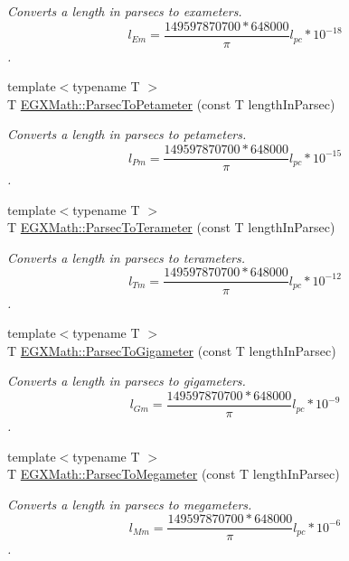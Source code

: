 \begin{DoxyCompactItemize}
\begin{DoxyCompactList}\small\item\em Converts a length in parsecs to exameters. \[ l_{Em}=\frac{149597870700 * 648000}{\pi}l_{pc} * 10^{-18} \]. \end{DoxyCompactList}\item 
{\footnotesize template$<$typename T $>$ }\\T \mbox{\hyperlink{group___e_g_x_math-_conversions-_length_conversions-_astronomical-_parsec-_s_i_ga9902983ed9563d247c8701370a95eb55}{E\+G\+X\+Math\+::\+Parsec\+To\+Petameter}} (const T length\+In\+Parsec)
\begin{DoxyCompactList}\small\item\em Converts a length in parsecs to petameters. \[ l_{Pm}=\frac{149597870700 * 648000}{\pi}l_{pc} * 10^{-15} \]. \end{DoxyCompactList}\item 
{\footnotesize template$<$typename T $>$ }\\T \mbox{\hyperlink{group___e_g_x_math-_conversions-_length_conversions-_astronomical-_parsec-_s_i_gafa04d007102c3b440653c9c0460b0cd8}{E\+G\+X\+Math\+::\+Parsec\+To\+Terameter}} (const T length\+In\+Parsec)
\begin{DoxyCompactList}\small\item\em Converts a length in parsecs to terameters. \[ l_{Tm}=\frac{149597870700 * 648000}{\pi}l_{pc} * 10^{-12} \]. \end{DoxyCompactList}\item 
{\footnotesize template$<$typename T $>$ }\\T \mbox{\hyperlink{group___e_g_x_math-_conversions-_length_conversions-_astronomical-_parsec-_s_i_ga8b4677ca02eae3ff100d1cdca6ae2392}{E\+G\+X\+Math\+::\+Parsec\+To\+Gigameter}} (const T length\+In\+Parsec)
\begin{DoxyCompactList}\small\item\em Converts a length in parsecs to gigameters. \[ l_{Gm}=\frac{149597870700 * 648000}{\pi}l_{pc} * 10^{-9} \]. \end{DoxyCompactList}\item 
{\footnotesize template$<$typename T $>$ }\\T \mbox{\hyperlink{group___e_g_x_math-_conversions-_length_conversions-_astronomical-_parsec-_s_i_ga2b7c62d851d25cb2041e3bc339110790}{E\+G\+X\+Math\+::\+Parsec\+To\+Megameter}} (const T length\+In\+Parsec)
\begin{DoxyCompactList}\small\item\em Converts a length in parsecs to megameters. \[ l_{Mm}=\frac{149597870700 * 648000}{\pi}l_{pc} * 10^{-6} \]. \end{DoxyCompactList}\item 

\end{DoxyCompactItemize}
